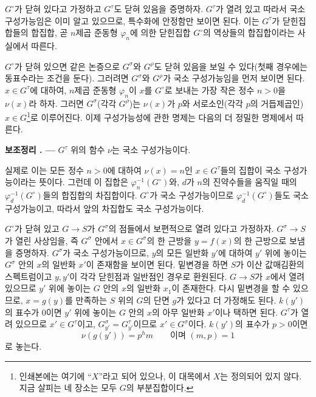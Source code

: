 \documentclass[11pt,twoside,openany]{book}
\numberwithin{equation}{section}
\newcommand{\sourceunit}{front}
\newcommand{\src}[1]{%
  \phantomsection\hypertarget{src:\sourceunit:#1}{}%
  \marginpar{\raggedleft\footnotesize\sffamily #1}%
}
\theoremstyle{plain}
\theoremstyle{definition}
\theoremstyle{remark}
\newcommand{\result}[2]{%
  \par\medskip\noindent\textbf{#1%
  \if\relax\detokenize{#2}\relax\else\space#2\fi. ---}\enspace
}
\begin{document}
\src{226}
$G^\circ$가 닫혀 있다고 가정하고 $G^\tau$도 닫혀 있음을 증명하자.
$G^\tau$가 열려 있고 따라서 국소 구성가능임은 이미 알고 있으므로,
특수화에 안정함만 보이면 된다. 이는 $G^\tau$가 닫힌집합들의 합집합,
곧 $n$제곱 준동형 $\varphi_n$에 의한 닫힌집합 $G^\circ$의 역상들의
합집합이라는 사실에서 따른다.

$G^\circ$가 닫혀 있으면 같은 논증으로 $G^\sigma$와 $G^\rho$도 닫혀
있음을 보일 수 있다(첫째 경우에는 동표수라는 조건을 둔다). 그러려면
$G^\sigma$와 $G^\rho$가 국소 구성가능임을 먼저 보이면 된다.
$x\in G^\tau$에 대하여, $n$제곱 준동형 $\varphi_n$이 $x$를
$G^\circ$로 보내는 가장 작은 정수 $n>0$을 $\nu(x)$라 하자. 그러면
$G^\sigma$(각각 $G^\rho$)는 $\nu(x)$가 $p$와 서로소인(각각 $p$의
거듭제곱인) $x\in G$\footnote{인쇄본에는 여기에 ``$X$''라고 되어 있으나,
이 대목에서 $X$는 정의되어 있지 않다. 지금 살피는 네 장소는 모두
$G$의 부분집합이다.}로 이루어진다. 이제 구성가능성에 관한 명제는 다음의
더 정밀한 명제에서 따른다.

\result{보조정리}{1.4} $G^\tau$ 위의 함수 $\nu$는 국소 구성가능이다.

실제로 이는 모든 정수 $n>0$에 대하여 $\nu(x)=n$인 $x\in G^\tau$들의
집합이 국소 구성가능이라는 뜻이다. 그런데 이 집합은
$\varphi_n^{-1}(G^\circ)$와, $d$가 $n$의 진약수들을 움직일 때의
$\varphi_d^{-1}(G^\circ)$들의 합집합의 차집합이다. $G^\circ$가 국소
구성가능이므로 $\varphi_d^{-1}(G^\circ)$들도 국소 구성가능이고, 따라서
앞의 차집합도 국소 구성가능이다.

$G^\circ$가 닫혀 있고 $G\longrightarrow S$가 $G^\sigma$의 점들에서
보편적으로 열려 있다고 가정하자. $G^\sigma\longrightarrow S$가 열린
사상임을, 즉 $G^\sigma$ 안에서 $x\in G^\sigma$의 한 근방을
$y=f(x)$의 한 근방으로 보냄을 증명하자. $G^\sigma$가 국소
구성가능이므로, $y$의 모든 일반화 $y'$에 대하여 $y'$ 위에 놓이는
$G^\sigma$ 안의 $x$의 일반화 $x'$이 존재함을 보이면 된다. 밑변경을
하면 $S$가 이산 값매김환의 스펙트럼이고 $y,y'$이 각각 닫힌점과
일반점인 경우로 환원된다. $G\longrightarrow S$가 $x$에서 열려 있으므로
$y'$ 위에 놓이는 $G$ 안의 $x$의 일반화 $x_1$이 존재한다. 다시 밑변경을
할 수 있으므로, $x=g(y)$를 만족하는 $S$ 위의 $G$의 단면 $g$가 있다고
더 가정해도 된다. $k(y')$의 표수가 0이면 $y'$ 위에 놓이는 $G$ 안의
$x$의 아무 일반화 $x'$이나 택하면 된다. $G^\tau$가 열려 있으므로
$x'\in G^\tau$이고, $G_{y'}^\sigma=G_{y'}^\tau$이므로
$x'\in G^\sigma$이다. $k(y')$의 표수가 $p>0$이면
\[
\nu(g(y'))=p^hm\qquad\text{이며 }(m,p)=1
\]
로 놓는다.
\end{document}

